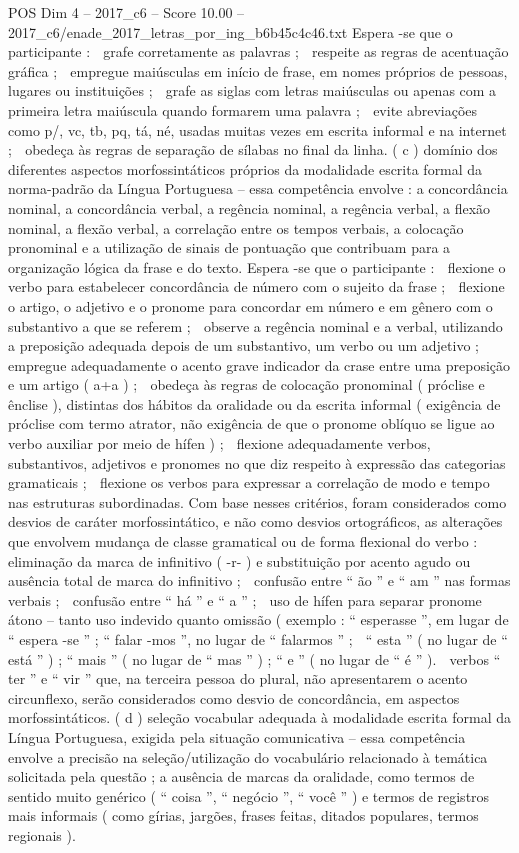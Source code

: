\begin{textsample}{POS Dim 4 – 2017\_c6 – Score 10.00 – 2017\_c6/enade\_2017\_letras\_por\_ing\_b6b45c4c46.txt}
Espera -se que o participante :  grafe corretamente as palavras ;  respeite as regras de acentuação gráfica ;  empregue maiúsculas em início de frase, em nomes próprios de pessoas, lugares ou instituições ;  grafe as siglas com letras maiúsculas ou apenas com a primeira letra maiúscula quando formarem uma palavra ;  evite abreviações como p/, vc, tb, pq, tá, né, usadas muitas vezes em escrita informal e na internet ;  obedeça às regras de separação de sílabas no final da linha. ( c ) domínio dos diferentes aspectos morfossintáticos próprios da modalidade escrita formal da norma-padrão da Língua Portuguesa – essa competência envolve : a concordância nominal, a concordância verbal, a regência nominal, a regência verbal, a flexão nominal, a flexão verbal, a correlação entre os tempos verbais, a colocação pronominal e a utilização de sinais de pontuação que contribuam para a organização lógica da frase e do texto.
Espera -se que o participante :  flexione o verbo para estabelecer concordância de número com o sujeito da frase ;  flexione o artigo, o adjetivo e o pronome para concordar em número e em gênero com o substantivo a que se referem ;  observe a regência nominal e a verbal, utilizando a preposição adequada depois de um substantivo, um verbo ou um adjetivo ;  empregue adequadamente o acento grave indicador da crase entre uma preposição e um artigo ( a+a ) ;  obedeça às regras de colocação pronominal ( próclise e ênclise ), distintas dos hábitos da oralidade ou da escrita informal ( exigência de próclise com termo atrator, não exigência de que o pronome oblíquo se ligue ao verbo auxiliar por meio de hífen ) ;  flexione adequadamente verbos, substantivos, adjetivos e pronomes no que diz respeito à expressão das categorias gramaticais ;  flexione os verbos para expressar a correlação de modo e tempo nas estruturas subordinadas.
Com base nesses critérios, foram considerados como desvios de caráter morfossintático, e não como desvios ortográficos, as alterações que envolvem mudança de classe gramatical ou de forma flexional do verbo :  eliminação da marca de infinitivo ( -r- ) e substituição por acento agudo ou ausência total de marca do infinitivo ;  confusão entre “ ão ” e “ am ” nas formas verbais ;  confusão entre “ há ” e “ a ” ;  uso de hífen para separar pronome átono – tanto uso indevido quanto omissão ( exemplo : “ esperasse ”, em lugar de “ espera -se ” ; “ falar -mos ”, no lugar de “ falarmos ” ;  “ esta ” ( no lugar de “ está ” ) ; “ mais ” ( no lugar de “ mas ” ) ; “ e ” ( no lugar de “ é ” ).  verbos “ ter ” e “ vir ” que, na terceira pessoa do plural, não apresentarem o acento circunflexo, serão considerados como desvio de concordância, em aspectos morfossintáticos. ( d ) seleção vocabular adequada à modalidade escrita formal da Língua Portuguesa, exigida pela situação comunicativa – essa competência envolve a precisão na seleção/utilização do vocabulário relacionado à temática solicitada pela questão ; a ausência de marcas da oralidade, como termos de sentido muito genérico ( “ coisa ”, “ negócio ”, “ você ” ) e termos de registros mais informais ( como gírias, jargões, frases feitas, ditados populares, termos regionais ).

\end{textsample}
